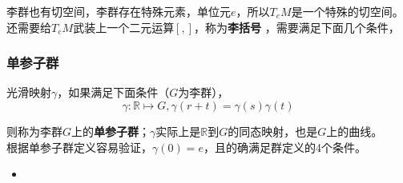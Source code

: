 李群也有切空间，李群存在特殊元素，单位元$e$，所以$T_eM$是一个特殊的切空间。\\

还需要给$T_eM$武装上一个二元运算$[,]$，称为\textbf{李括号} ，需要满足下面几个条件，

\subsubsection*{单参子群}
	光滑映射$\gamma$，如果满足下面条件（$G$为李群），
	$$
		\gamma: \mathbb{R}\mapsto G, \gamma(r+t) = \gamma(s)\gamma(t)
	$$

	则称为李群$G$上的\textbf{单参子群}；$\gamma$实际上是$\mathbb{R}$到$G$的同态映射，也是$G$上的曲线。\\

	根据单参子群定义容易验证，$\gamma(0) = e$，且的确满足群定义的4个条件。

\begin{itemize}
\item 
\end{itemize}